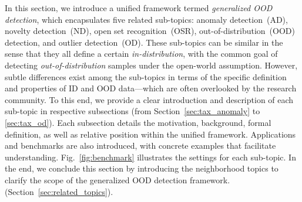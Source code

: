 \label{sec:general-ood}
 In this section, we introduce a unified framework termed \emph{generalized OOD detection}, which encapsulates five related sub-topics: anomaly detection~(AD), novelty detection~(ND), open set recognition~(OSR), out-of-distribution~(OOD) detection, and outlier detection~(OD).
These sub-topics can be similar in the sense that they all define a certain \emph{in-distribution}, with the common goal of detecting \emph{out-of-distribution} samples under the open-world assumption.
However, subtle differences exist among the sub-topics in terms of the specific definition and properties of ID and OOD data---which are often overlooked by the research community. To this end, we provide a clear introduction and description of each sub-topic in respective subsections (from Section~\ref{sec:tax_anomaly} to \ref{sec:tax_od}). Each subsection details the motivation, background, formal definition, as well as relative position within the unified framework. 
Applications and benchmarks are also introduced, with concrete examples that facilitate understanding.
Fig.~\ref{fig:benchmark} illustrates the settings for each sub-topic.
In the end, we conclude this section by introducing the neighborhood topics to clarify the scope of the generalized OOD detection framework. (Section~\ref{sec:related_topics}).
